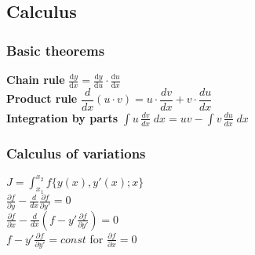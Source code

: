 \documentclass[letterpaper,landscape,10pt]{article}
\begin{document}
{\begin{multicols}{3}
	\subsection*{Calculus}

		\subsubsection*{Basic theorems}
			\textbf{Chain rule} $\frac{\mathrm dy}{\mathrm dx}=\frac{\mathrm dy}{\mathrm du}\cdot\frac
				{\mathrm du}{\mathrm dx}$ \\
			\textbf{Product rule} $\dfrac{d}{dx}(u\cdot v)=u\cdot \dfrac{dv}{dx}+v\cdot \dfrac{du}{dx}$ \\
			\textbf{Integration by parts} $\int u\, \frac{dv}{dx}\; dx=uv-\int v\, \frac{du}{dx} \; dx$

		\subsubsection*{Calculus of variations}
			$J = \int_{x_1}^{x_2} f\{y(x), y\prime (x); x\}$\\
			$\frac{\partial f}{\partial y}-\frac{d}{dx}\frac{\partial
			f}{\partial y\prime} = 0$\\
			$\frac{\partial f}{\partial x}-\frac{d}{dx}\left(f-y\prime
			\frac{\partial f}{\partial y\prime}\right) = 0$\\
			$f-y\prime \frac{\partial f}{\partial y\prime} =
				const$ for $\frac{\partial f}{\partial x} = 0$


\end{multicols}}
\end{document}
